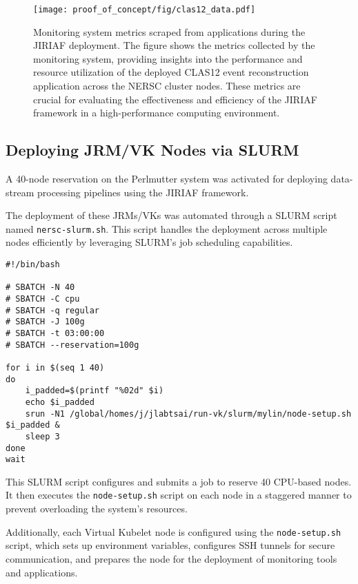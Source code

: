 \begin{figure}[h]
    \centering
    \texttt{[image: proof\_of\_concept/fig/clas12\_data.pdf]}
    \caption{Monitoring system metrics scraped from applications during the JIRIAF deployment. The figure shows the metrics collected by the monitoring system, providing insights into the performance and resource utilization of the deployed CLAS12 event reconstruction application across the NERSC cluster nodes. These metrics are crucial for evaluating the effectiveness and efficiency of the JIRIAF framework in a high-performance computing environment.}
    \label{fig:monitoring_metrics}
\end{figure}

\newpage

\subsection{Deploying JRM/VK Nodes via SLURM}
A 40-node reservation on the Perlmutter system was activated for deploying data-stream processing pipelines using the JIRIAF framework.

The deployment of these JRMs/VKs was automated through a SLURM script named \texttt{nersc-slurm.sh}. This script handles the deployment across multiple nodes efficiently by leveraging SLURM's job scheduling capabilities.

\begin{verbatim}
#!/bin/bash

# SBATCH -N 40
# SBATCH -C cpu
# SBATCH -q regular
# SBATCH -J 100g
# SBATCH -t 03:00:00
# SBATCH --reservation=100g

for i in $(seq 1 40)
do
    i_padded=$(printf "%02d" $i)
    echo $i_padded
    srun -N1 /global/homes/j/jlabtsai/run-vk/slurm/mylin/node-setup.sh $i_padded &
    sleep 3
done
wait
\end{verbatim}

This SLURM script configures and submits a job to reserve 40 CPU-based nodes. It then executes the \texttt{node-setup.sh} script on each node in a staggered manner to prevent overloading the system's resources.

Additionally, each Virtual Kubelet node is configured using the \texttt{node-setup.sh} script, which sets up environment variables, configures SSH tunnels for secure communication, and prepares the node for the deployment of monitoring tools and applications.

